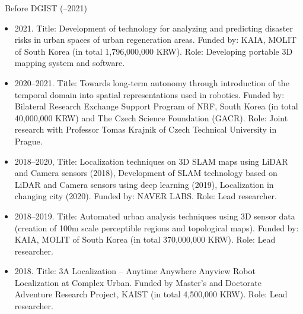 \vspace{2mm}
\ Before DGIST (--2021)
\vspace{-1mm}
\begin{itemize}[label=$\cdot$]
    \item 2021. Title: Development of technology for analyzing and predicting disaster risks in urban spaces of urban regeneration areas. Funded by: KAIA, MOLIT of South Korea (in total 1,796,000,000 KRW). Role: Developing portable 3D mapping system and software. 
    \vspace{-1mm}
    \item 2020--2021. Title: Towards long-term autonomy through introduction of the temporal domain into spatial representations used in robotics. Funded by: Bilateral Research Exchange Support Program of NRF, South Korea (in total 40,000,000 KRW) and The Czech Science Foundation (GACR). Role: Joint research with Professor Tomas Krajnik of Czech Technical University in Prague.
    \vspace{-1mm}
    \item 2018--2020, Title: Localization techniques on 3D SLAM maps using LiDAR and Camera sensors (2018), Development of SLAM technology based on LiDAR and Camera sensors using deep learning (2019), Localization in changing city (2020). Funded by: NAVER LABS. Role: Lead researcher.
    \vspace{-1mm}
    \item 2018--2019. Title: Automated urban analysis techniques using 3D sensor data (creation of 100m scale perceptible regions and topological maps). Funded by: KAIA, MOLIT of South Korea (in total 370,000,000 KRW). Role: Lead researcher.
    \vspace{-1mm}
    \item 2018. Title: 3A Localization -- Anytime Anywhere Anyview Robot Localization at Complex Urban. Funded by Master's and Doctorate Adventure Research Project, KAIST (in total 4,500,000 KRW). Role: Lead researcher.
\end{itemize}